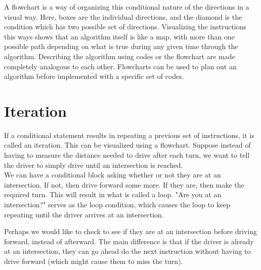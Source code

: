 A flowchart is a way of organizing this conditional nature of the directions in a visual way. Here, boxes are the individual directions, and the diamond is the condition which has two possible set of directions. Visualizing the instructions this ways shows that an algorithm itself is like a map, with more than one possible path depending on what is true during any given time through the algorithm. Describing the algorithm using codes or the flowchart are made completely analogous to each other. Flowcharts can be used to plan out an algorithm before implemented with a specific set of codes.\\

\begin{center} \end{center}

\section{Iteration}

If a conditional statement results in repeating a previous set of instructions, it is called an iteration. This can be visualized using a flowchart. Suppose instead of having to measure the distance needed to drive after each turn, we want to tell the driver to simply drive until an intersection is reached.\\

We can have a conditional block asking whether or not they are at an intersection. If not, then drive forward some more. If they are, then make the required turn. This will result in what is called a loop. "Are you at an intersection?" serves as the loop condition, which causes the loop to keep repeating until the driver arrives at an intersection. \\

\begin{center} \end{center}

Perhaps we would like to check to see if they are at an intersection before driving forward, instead of afterward. The main difference is that if the driver is already at an intersection, they can go ahead do the next instruction without having to drive forward (which might cause them to miss the turn).\\

\begin{center} \end{center}

